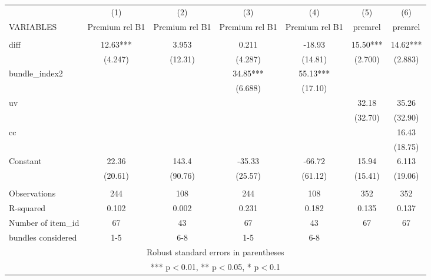 \documentclass[]{article}
\begin{document}
\begin{tabular}{lcccccc} \hline
 & (1) & (2) & (3) & (4) & (5) & (6) \\
VARIABLES & Premium rel B1 & Premium rel B1 & Premium rel B1 & Premium rel B1 & premrel & premrel \\ \hline
 &  &  &  &  &  &  \\
diff & 12.63*** & 3.953 & 0.211 & -18.93 & 15.50*** & 14.62*** \\
 & (4.247) & (12.31) & (4.287) & (14.81) & (2.700) & (2.883) \\
bundle\_index2 &  &  & 34.85*** & 55.13*** &  &  \\
 &  &  & (6.688) & (17.10) &  &  \\
uv &  &  &  &  & 32.18 & 35.26 \\
 &  &  &  &  & (32.70) & (32.90) \\
cc &  &  &  &  &  & 16.43 \\
 &  &  &  &  &  & (18.75) \\
Constant & 22.36 & 143.4 & -35.33 & -66.72 & 15.94 & 6.113 \\
 & (20.61) & (90.76) & (25.57) & (61.12) & (15.41) & (19.06) \\
 &  &  &  &  &  &  \\
Observations & 244 & 108 & 244 & 108 & 352 & 352 \\
R-squared & 0.102 & 0.002 & 0.231 & 0.182 & 0.135 & 0.137 \\
Number of item\_id & 67 & 43 & 67 & 43 & 67 & 67 \\
 bundles considered & 1-5 & 6-8 & 1-5 & 6-8 &  &  \\ \hline
\multicolumn{7}{c}{ Robust standard errors in parentheses} \\
\multicolumn{7}{c}{ *** p$<$0.01, ** p$<$0.05, * p$<$0.1} \\
\end{tabular}
\end{document}
